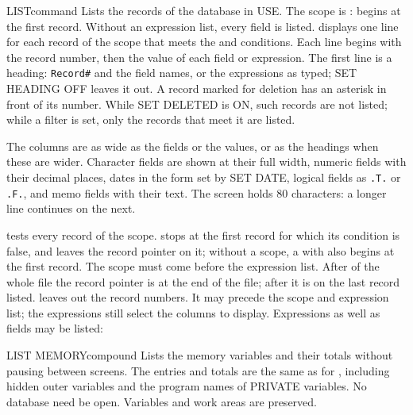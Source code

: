 \begin{XbaseEntry}{LIST}{command}
Lists the records of the database in USE.
\Syntax
{}
\Defaults
The scope is :  begins at the first record.  Without an
expression list, every field is listed.
\Usage
{} displays one line for each record of the scope that meets the
 and  conditions.  Each line begins with the record number,
then the value of each field or expression.  The first line is a heading:
\texttt{Record\#} and the field names, or the expressions as typed; SET
HEADING OFF leaves it out.  A record marked for deletion has an asterisk in
front of its number.  While SET DELETED is ON, such records are not listed;
while a filter is set, only the records that meet it are listed.

The columns are as wide as the fields or the values, or as the headings when
these are wider.  Character fields are shown at their full width, numeric
fields with their decimal places, dates in the form set by SET DATE, logical
fields as \texttt{.T.} or \texttt{.F.}, and memo fields with their text.  The
screen holds 80 characters: a longer line continues on the next.

 tests every record of the scope.   stops at the first record
for which its condition is false, and leaves the record pointer on it; without
a scope, a  with  also begins at the first record.  The
scope must come before the expression list.  After  of the whole
file the record pointer is at the end of the file; after   it is
on the last record listed.
\Options
{} leaves out the record numbers.  It may precede the scope and
expression list; the expressions still select the columns to display.
\Examples
{}
Expressions as well as fields may be listed:
\end{XbaseEntry}

\begin{XbaseEntry}{LIST MEMORY}{compound}
Lists the memory variables and their totals without pausing between screens.
\Syntax
{}
\Usage
The entries and totals are the same as for , including
hidden outer variables and the program names of PRIVATE variables.
No database need be open.  Variables and work areas are preserved.
\end{XbaseEntry}

